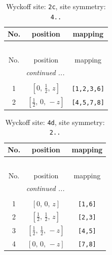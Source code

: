 \documentclass[fleqn,8pt]{jsarticle}
\begin{document}
\renewcommand{\arraystretch}{1.2}
\begin{longtable}{ccc}
\caption{Wyckoff site: {\tt 2c}, site symmetry: {\tt 4..}}
 \\
 \hline \hline
No. & position & mapping \\ \hline \endfirsthead

\multicolumn{2}{l}{\tablename\ \thetable{}} \\
 \hline \hline
No. & position & mapping \\ \hline \endhead

 \hline \hline
\multicolumn{2}{r}{\footnotesize\it continued ...} \\ \endfoot

 \hline \hline
\multicolumn{2}{r}{} \\ \endlastfoot

1 & $\left[ 0,\, \frac{1}{2},\, z \right]$ & {\tt [1,2,3,6]} \\ \hline
2 & $\left[ \frac{1}{2},\, 0,\, - z \right]$ & {\tt [4,5,7,8]} \\
\end{longtable}
\renewcommand{\arraystretch}{1.2}
\begin{longtable}{ccc}
\caption{Wyckoff site: {\tt 4d}, site symmetry: {\tt 2..}}
 \\
 \hline \hline
No. & position & mapping \\ \hline \endfirsthead

\multicolumn{2}{l}{\tablename\ \thetable{}} \\
 \hline \hline
No. & position & mapping \\ \hline \endhead

 \hline \hline
\multicolumn{2}{r}{\footnotesize\it continued ...} \\ \endfoot

 \hline \hline
\multicolumn{2}{r}{} \\ \endlastfoot

1 & $\left[ 0,\, 0,\, z \right]$ & {\tt [1,6]} \\ \hline
2 & $\left[ \frac{1}{2},\, \frac{1}{2},\, z \right]$ & {\tt [2,3]} \\ \hline
3 & $\left[ \frac{1}{2},\, \frac{1}{2},\, - z \right]$ & {\tt [4,5]} \\ \hline
4 & $\left[ 0,\, 0,\, - z \right]$ & {\tt [7,8]} \\
\end{longtable}
\renewcommand{\arraystretch}{1.2}
\end{document}
